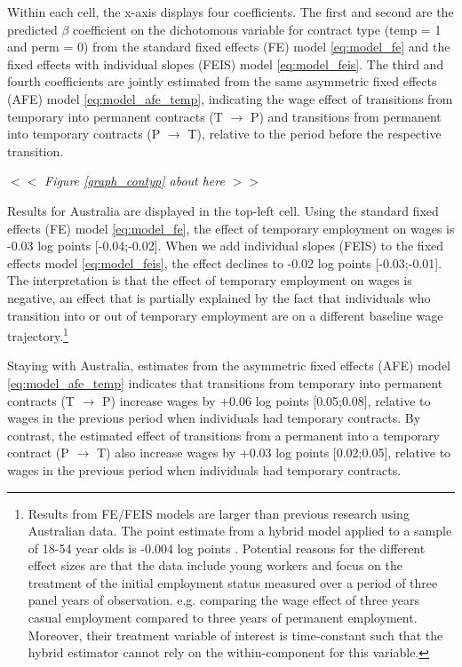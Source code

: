 \documentclass[12pt]{article}
\begin{document}
Within each cell, the x-axis displays four coefficients.  The first and second are the predicted $\beta$ coefficient on the dichotomous variable for contract type (temp = 1 and perm = 0) from the standard fixed effects (FE) model \ref{eq:model_fe} and the fixed effects with individual slopes (FEIS) model \ref{eq:model_feis}.  The third and fourth coefficients are jointly estimated from the same asymmetric fixed effects (AFE) model \ref{eq:model_afe_temp}, indicating the wage effect of transitions from temporary into permanent contracts (T $\rightarrow$ P) and transitions from permanent into temporary contracts (P $\rightarrow$ T), relative to the period before the respective transition. 

\begin{center}
$<<$ \emph{Figure \ref{graph_contyp} about here} $>>$
\end{center}

Results for Australia are displayed in the top-left cell.  Using the standard fixed effects (FE) model \ref{eq:model_fe}, the effect of temporary employment on wages is -0.03 log points [-0.04;-0.02].  When we add individual slopes (FEIS) to the fixed effects model \ref{eq:model_feis}, the effect declines to -0.02 log points [-0.03;-0.01].  The interpretation is that the effect of temporary employment on wages is negative, an effect that is partially explained by the fact that individuals who transition into or out of temporary employment are on a different baseline wage trajectory.\footnote{Results from FE/FEIS models are larger than previous research using Australian data.  The point estimate from a hybrid model applied to a sample of 18-54 year olds is -0.004 log points \citep{mooi-reci_casual_2017}.  Potential reasons for the different effect sizes are that the data include young workers and focus on the treatment of the initial employment status measured over a period of three panel years of observation. e.g. comparing the wage effect of three years casual employment compared to three years of permanent employment. Moreover, their treatment variable of interest is time-constant such that the hybrid estimator cannot rely on the within-component for this variable. }     

Staying with Australia, estimates from the asymmetric fixed effects (AFE) model \ref{eq:model_afe_temp} indicates that transitions from temporary into permanent contracts (T $\rightarrow$ P) increase wages by +0.06 log points [0.05;0.08], relative to wages in the previous period when individuals had temporary contracts.  By contrast, the estimated effect of transitions from a permanent into a temporary contract (P $\rightarrow$ T) also increase wages by +0.03 log points [0.02;0.05], relative to wages in the previous period when individuals had temporary contracts.  
\end{document}
